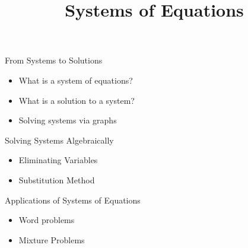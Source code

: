 \documentclass{ximera}
\author{}
\title{Systems of Equations}
\begin{document}
\begin{abstract}
\end{abstract}
\maketitle


\begin{objectives}

\item From Systems to Solutions
\begin{itemize}
	\item What is a system of equations? 
	\item What is a solution to a system? 
	\item Solving systems via graphs 
\end{itemize}

\item Solving Systems Algebraically
\begin{itemize}
	\item Eliminating Variables 
	\item Substitution Method 
\end{itemize}


\item Applications of Systems of Equations
\begin{itemize}
	\item Word problems
	\item Mixture Problems
\end{itemize}


\end{objectives}
\end{document}
